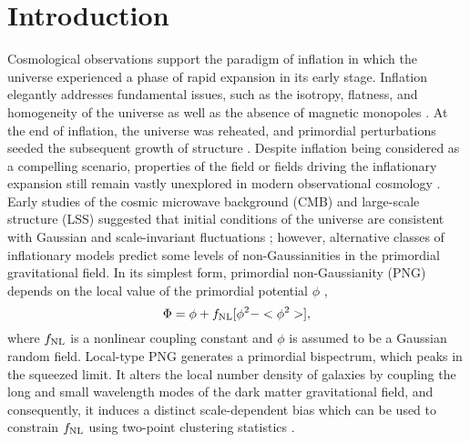 \section{Introduction}
\label{sec:introduction}
Cosmological observations support the paradigm of inflation in which the universe experienced a phase of rapid expansion in its early stage. Inflation elegantly addresses fundamental issues, such as the isotropy, flatness, and homogeneity of the universe as well as the absence of magnetic monopoles \citep[see, e.g.,][for a review]{weinberg2013observational}. At the end of inflation, the universe was reheated, and primordial perturbations seeded the subsequent growth of structure \citep{kofman1994reheating, bassett2006inflation, lyth2009primordial}. Despite inflation being considered as a compelling scenario, properties of the field or fields driving the inflationary expansion still remain vastly unexplored in modern observational cosmology \citep[see, e.g.,][for a review]{Biagetti2019Galax...7...71B}. Early studies of the cosmic microwave background (CMB) and large-scale structure (LSS) suggested that initial conditions of the universe are consistent with Gaussian and scale-invariant fluctuations \citep{PhysRevD.69.103501, guth2005inflationary}; however, alternative classes of inflationary models predict some levels of non-Gaussianities in the primordial gravitational field. In its simplest form, primordial non-Gaussianity (PNG) depends on the local value of the primordial potential $\phi$ \citep{komatsu2001acoustic},
\begin{equation}
 \Phi = \phi + f_{\rm NL} [\phi^{2} - <\phi^{2}>],
\end{equation}
where $f_{\rm NL}$ is a nonlinear coupling constant and $\phi$ is assumed to be a Gaussian random field. Local-type PNG generates a primordial bispectrum, which peaks in the squeezed limit. It alters the local number density of galaxies by coupling the long and small wavelength modes of the dark matter gravitational field, and consequently, it induces a distinct scale-dependent bias which can be used to constrain $f_{\rm NL}$ using two-point clustering statistics \citep{dalal2008imprints}. 

